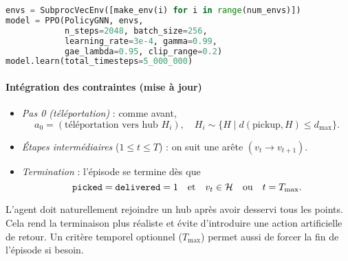 \documentclass[11pt,a4paper]{article}
\begin{document}
\begin{lstlisting}[language=Python,basicstyle=\ttfamily\small,frame=single,caption={Extraction minimale du script d'entraînement},label={lst:ppo}]
envs = SubprocVecEnv([make_env(i) for i in range(num_envs)])
model = PPO(PolicyGNN, envs,
            n_steps=2048, batch_size=256,
            learning_rate=3e-4, gamma=0.99,
            gae_lambda=0.95, clip_range=0.2)
model.learn(total_timesteps=5_000_000)
\end{lstlisting}

\label{sec:rl_gnn}

\paragraph{Intégration des contraintes (mise à jour)}  
\begin{itemize}
  \item \emph{Pas 0 (téléportation)} : comme avant,  
    \[
      a_0 = (\text{téléportation vers hub }H_i),\quad H_i\sim\{H\mid d(\text{pickup},H)\le d_{\max}\}.
    \]
  \item \emph{Étapes intermédiaires} (\(1\le t \le T\)) : on suit une arête \((v_t\to v_{t+1})\).
  \item \emph{Termination} : l'épisode se termine dès que  
    \[
      \text{\texttt{picked}}=\text{\texttt{delivered}}=1
      \quad\text{et}\quad
      v_t\in\mathcal{H}
      \quad\text{ou}\quad
      t=T_{\max}.
    \]
\end{itemize}

L'agent doit naturellement rejoindre un hub après avoir desservi tous les points. Cela rend la terminaison plus réaliste et évite d'introduire une action artificielle de retour. Un critère temporel optionnel (\(T_{\max}\)) permet aussi de forcer la fin de l'épisode si besoin.
\end{document}

